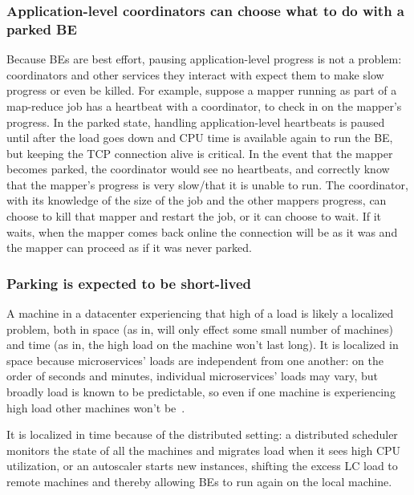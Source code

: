 \subsubsection{Application-level coordinators can choose what to do with a
parked BE} Because BEs are best effort, pausing application-level progress is
not a problem: coordinators and other services they interact with expect them to
make slow progress or even be killed. For example, suppose a mapper running as
part of a map-reduce job has a heartbeat with a coordinator, to check in on the
mapper's progress. In the parked state, handling application-level heartbeats is
paused until after the load goes down and CPU time is available again to run the
BE, but keeping the TCP connection alive is critical. In the event that the
mapper becomes parked, the coordinator would see no heartbeats, and correctly
know that the mapper's progress is very slow/that it is unable to run. The
coordinator, with its knowledge of the size of the job and the other mappers
progress, can choose to kill that mapper and restart the job, or it can choose
to wait. If it waits, when the mapper comes back online the connection will be
as it was and the mapper can proceed as if it was never parked.

\subsubsection{Parking is expected to be short-lived}
A machine in a datacenter experiencing that high of a load is likely a localized
problem, both in space (as in, will only effect some small number of machines)
and time (as in, the high load on the machine won't last long). It is localized
in space because microservices' loads are independent from one another: on the
order of seconds and minutes, individual microservices' loads may vary, but
broadly load is known to be predictable, so even if one machine is experiencing
high load other machines won't be~\cite{TODO}. 

It is localized in time because of the distributed setting: a distributed
scheduler monitors the state of all the machines and migrates load when it sees
high CPU utilization, or an autoscaler starts new instances, shifting the excess
LC load to remote machines and thereby allowing BEs to run again on the local
machine.